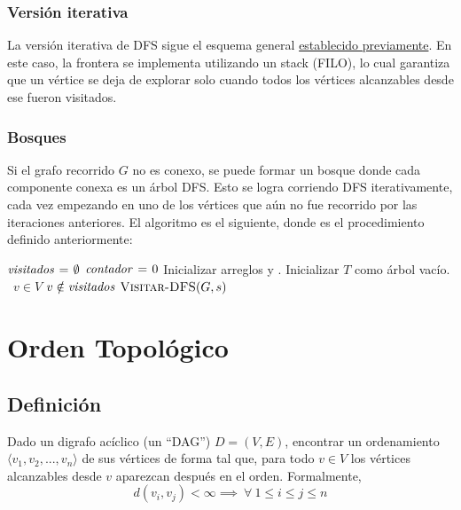 \documentclass[a4paper]{report}
\newcommand{\Each}{\kw{each}\ }
\begin{document}
\subsubsection{Versión iterativa}

La versión iterativa de DFS sigue el esquema general \hyperref[recorridos]{establecido previamente}. En este caso, la frontera se implementa utilizando un stack (FILO), lo cual garantiza que un vértice se deja de explorar solo cuando todos los vértices alcanzables desde ese fueron visitados.

\subsubsection{Bosques}

Si el grafo recorrido $G$ no es conexo, se puede formar un bosque donde cada componente conexa es un árbol DFS. Esto se logra corriendo DFS iterativamente, cada vez empezando en uno de los vértices que aún no fue recorrido por las iteraciones anteriores. El algoritmo es el siguiente, donde  es el procedimiento definido anteriormente:

\begin{codebox}
    \li $\id{visitados} \gets \emptyset$
    \li $\id{contador} \gets 0$
    \li Inicializar arreglos  y .
    \li Inicializar $T$ como árbol vacío.
    \li \For \Each $v \in V$ \Do
    \li \If $v \notin \id{visitados}$ \Then
    \li $\textnormal{\scshape Visitar-DFS}(G, s)$
    \End
    \End
\end{codebox}

\section{Orden Topológico}

\subsection{Definición}

\begin{problema}
    Dado un digrafo acíclico (un ``DAG'') $D = (V, E)$, encontrar un ordenamiento $\langle v_1, v_2, ..., v_n \rangle$ de sus vértices de forma tal que, para todo $v \in V$ los vértices alcanzables desde $v$ aparezcan después en el orden. Formalmente,
    $$d(v_i, v_j) < \infty \implies\ \forall\ 1 \leq i \leq j \leq n$$
\end{problema}
\end{document}
